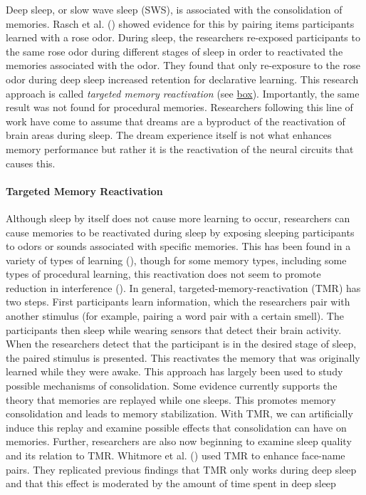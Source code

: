 \documentclass[
]{krantz}
\begin{document}
Deep sleep, or slow wave sleep (SWS), is associated with the consolidation of memories. Rasch et al. () showed evidence for this by pairing items participants learned with a rose odor. During sleep, the researchers re-exposed participants to the same rose odor during different stages of sleep in order to reactivated the memories associated with the odor. They found that only re-exposure to the rose odor during deep sleep increased retention for declarative learning. This research approach is called \emph{targeted memory reactivation} (see \hyperref[targeted-memory-reactivation]{box}). Importantly, the same result was not found for procedural memories. Researchers following this line of work have come to assume that dreams are a byproduct of the reactivation of brain areas during sleep. The dream experience itself is not what enhances memory performance but rather it is the reactivation of the neural circuits that causes this.

\paragraph*{Targeted Memory Reactivation}\label{targeted-memory-reactivation}

Although sleep by itself does not cause more learning to occur, researchers can cause memories to be reactivated during sleep by exposing sleeping participants to odors or sounds associated with specific memories. This has been found in a variety of types of learning (), though for some memory types, including some types of procedural learning, this reactivation does not seem to promote reduction in interference (). In general, targeted-memory-reactivation (TMR) has two steps. First participants learn information, which the researchers pair with another stimulus (for example, pairing a word pair with a certain smell). The participants then sleep while wearing sensors that detect their brain activity. When the researchers detect that the participant is in the desired stage of sleep, the paired stimulus is presented. This reactivates the memory that was originally learned while they were awake. This approach has largely been used to study possible mechanisms of consolidation. Some evidence currently supports the theory that memories are replayed while one sleeps. This promotes memory consolidation and leads to memory stabilization. With TMR, we can artificially induce this replay and examine possible effects that consolidation can have on memories. Further, researchers are also now beginning to examine sleep quality and its relation to TMR. Whitmore et al. () used TMR to enhance face-name pairs. They replicated previous findings that TMR only works during deep sleep and that this effect is moderated by the amount of time spent in deep sleep
\end{document}
